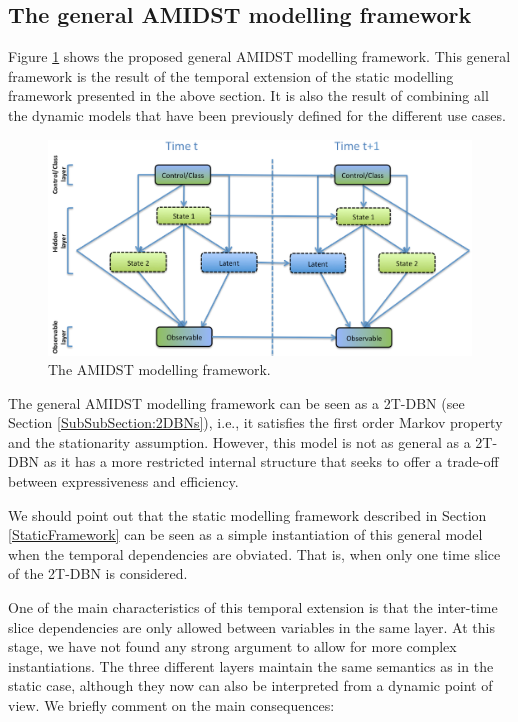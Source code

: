 \subsection{The general AMIDST modelling framework}\label{GeneralModelClass}

Figure \ref{Figure:AMIDSTModelClass} shows the proposed general AMIDST modelling framework. This general framework is the result of the temporal extension of the static modelling framework presented in the above section. It is also the result of combining all the dynamic models that have been previously defined for the different use cases. 

\begin{figure}[ht!]
\begin{center}
\includegraphics[scale=0.465]{./figures/AMIDSTModelClass}
\caption{\label{Figure:AMIDSTModelClass} The AMIDST modelling framework.}
\end{center}
\end{figure}

The general AMIDST modelling framework can be seen as a 2T-DBN (see Section \ref{SubSubSection:2DBNs}), i.e., it
satisfies the first order Markov property and the stationarity assumption. However, this model is not as general as a
2T-DBN as it has a more restricted internal structure that seeks to offer a  trade-off between expressiveness and efficiency. 

We should point out that the static modelling framework described in Section \ref{StaticFramework} can be seen as a
simple instantiation of this general model when the temporal dependencies are obviated. That is, when only one time slice of the 2T-DBN is considered. 

One of the main characteristics of this temporal extension is that the inter-time slice dependencies are only allowed
between variables in the same layer. At this stage, we have not found any strong argument to allow for more complex
instantiations. The three different layers maintain the same semantics as in the static case, although  they now can
also be interpreted from a dynamic point of view. We briefly comment on the main consequences: 

